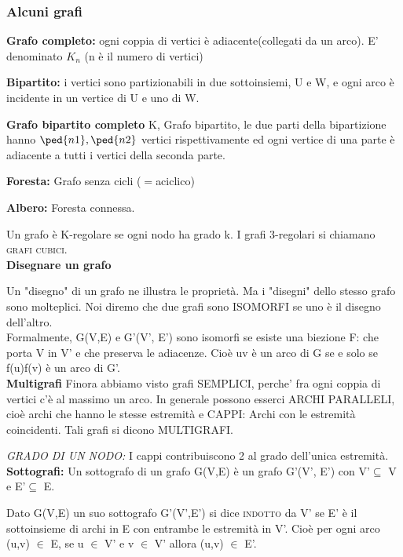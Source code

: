 \documentclass[12pt,a4paper]{article}
\begin{document}
\subsubsection{Alcuni grafi} \par
\textbf{Grafo completo:} ogni coppia di vertici è adiacente(collegati da un arco). E' denominato $K_n$ (n è il numero di vertici) \par
\textbf{Bipartito:} i vertici sono partizionabili in due sottoinsiemi, U e W, e ogni arco è incidente in un vertice di U e uno di W. \par
\textbf{Grafo bipartito completo} K, Grafo bipartito, le due parti della bipartizione hanno \( \ped{n1}, \ped{n2} \) vertici rispettivamente ed ogni vertice di una parte è adiacente a tutti i vertici della seconda parte. \par
\textbf{Foresta:} Grafo senza cicli ($=$aciclico) \par
\textbf{Albero:} Foresta connessa. \par
Un grafo è K-regolare se ogni nodo ha grado k. I grafi 3-regolari si chiamano \textsc{grafi cubici}. \\


\textbf{Disegnare un grafo} \par
 Un "disegno" di un grafo ne illustra le proprietà. Ma i "disegni" dello stesso grafo sono molteplici. Noi
diremo che due grafi sono \textsc{ISOMORFI} se uno è il disegno dell'altro. \\
Formalmente, G(V,E) e G’(V’, E’) sono isomorfi se esiste una biezione F: che porta V in V’ e che preserva le
adiacenze. Cioè uv è un arco di G se e solo se f(u)f(v) è un arco di G’. \\

\textbf{Multigrafi} Finora abbiamo visto grafi SEMPLICI, perche' fra ogni coppia di vertici c'è al massimo un arco. In generale possono esserci ARCHI PARALLELI, cioè archi che hanno le stesse estremità e CAPPI: Archi
con le estremità coincidenti. Tali grafi si dicono MULTIGRAFI. \par
\textit{GRADO DI UN NODO:} I cappi contribuiscono 2 al grado dell'unica estremità.\\

\textbf{Sottografi:} Un sottografo di un grafo G(V,E) è un grafo G'(V', E') con V'$\subseteq$ V e E'$\subseteq$ E. \par
Dato G(V,E) un suo sottografo G'(V',E') si dice \textsc{indotto} da V' se E' è il sottoinsieme di archi in E con entrambe le estremità in V'. Cioè per ogni arco (u,v) $\in$ E, se u $\in$ V' e v $\in$ V' allora (u,v) $\in$ E'. \\
\end{document}
